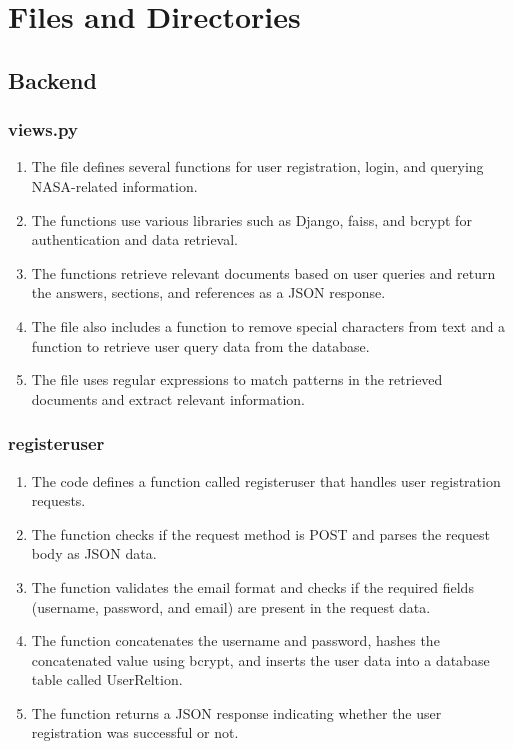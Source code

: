 \documentclass[11pt]{article}
\begin{document}
\section{Files and Directories}

\subsection{Backend}
\subsubsection{views.py}

\begin{enumerate}
	\item The file defines several functions for user registration, login, and querying NASA-related information.
	\item The functions use various libraries such as Django, faiss, and bcrypt for authentication and data retrieval.
	\item The functions retrieve relevant documents based on user queries and return the answers, sections, and references as a JSON response.
	\item The file also includes a function to remove special characters from text and a function to retrieve user query data from the database.
	\item The file uses regular expressions to match patterns in the retrieved documents and extract relevant information.
\end{enumerate}

\subsubsection{registeruser}
\begin{enumerate}
	\item The code defines a function called registeruser that handles user registration requests.
	\item The function checks if the request method is POST and parses the request body as JSON data.
	\item The function validates the email format and checks if the required fields (username, password, and email) are present in the request data.
	\item The function concatenates the username and password, hashes the concatenated value using bcrypt, and inserts the user data into a database table called UserReltion.
	\item The function returns a JSON response indicating whether the user registration was successful or not.
\end{enumerate}
\end{document}
